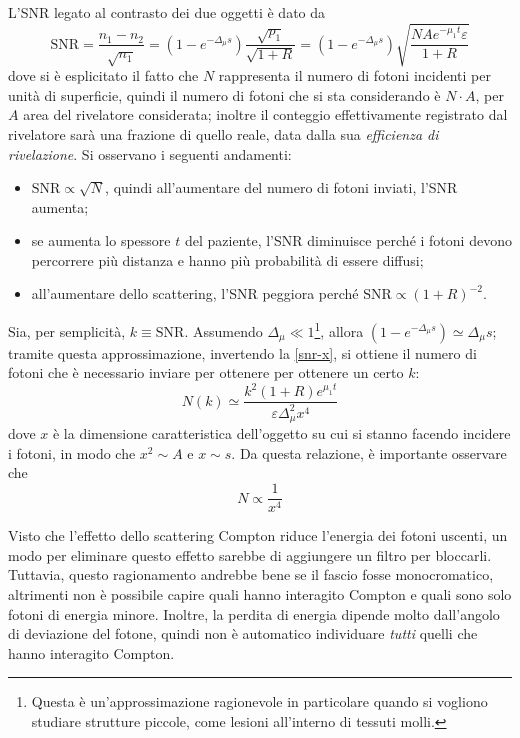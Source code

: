 \documentclass[11pt, a4paper]{scrartcl}
\theoremstyle{style}
\theoremstyle{style1}
\numberwithin{equation}{subsection}
\begin{document}
\noindent L'SNR legato al contrasto dei due oggetti \`e dato da 
\begin{equation}\label{snr-x}
\text{SNR} = \frac{n_1 - n_2}{ \sqrt{n_1} } = \left(1-e^{-\Delta _\mu  s}\right) \frac{\sqrt{p_1} }{\sqrt{1+R} } = \left(1- e^{-\Delta _\mu s}\right) \sqrt{\frac{NAe^{-\mu _1 t}\varepsilon }{1+R}} 
\end{equation}
dove si \`e esplicitato il fatto che $N$ rappresenta il numero di fotoni incidenti per unit\`a di superficie, quindi il numero di fotoni che si sta considerando \`e $N\cdot A$, per $A$ area del rivelatore considerata; inoltre il conteggio effettivamente registrato dal rivelatore sar\`a una frazione di quello reale, data dalla sua \textit{efficienza di rivelazione}.
Si osservano i seguenti andamenti:
\begin{itemize}
	\item $\text{SNR}\propto \sqrt{N} $, quindi all'aumentare del numero di fotoni inviati, l'SNR aumenta;
	\item se aumenta lo spessore $t$ del paziente, l'SNR diminuisce perch\'e i fotoni devono percorrere pi\`u distanza e hanno pi\`u probabilit\`a di essere diffusi;
	\item all'aumentare dello scattering, l'SNR peggiora perch\'e $\text{SNR} \propto (1+R)^{-2}$.
\end{itemize}
Sia, per semplicit\`a, $k\equiv \text{SNR}$.
Assumendo $\Delta _\mu  \ll 1$\footnote{Questa \`e un'approssimazione ragionevole in particolare quando si vogliono studiare strutture piccole, come lesioni all'interno di tessuti molli.}, allora $\left(1- e^{-\Delta _\mu  s}\right) \simeq \Delta _{\mu }s$; tramite questa approssimazione, invertendo la \ref{snr-x}, si ottiene il numero di fotoni che \`e necessario inviare per ottenere per ottenere un certo $k$:
\begin{equation}
	N(k) \simeq \frac{k^2 (1+R) e^{\mu _1 t}}{\varepsilon \Delta _\mu ^2 x^4}
\end{equation}
dove $x$ \`e la dimensione caratteristica dell'oggetto su cui si stanno facendo incidere i fotoni, in modo che $x^2 \sim A$ e $x \sim s$.
Da questa relazione, \`e importante osservare che 
\begin{equation}
	N \propto \frac{1}{x^4}
\end{equation}

Visto che l'effetto dello scattering Compton riduce l'energia dei fotoni uscenti, un modo per eliminare questo effetto sarebbe di aggiungere un filtro per bloccarli.
Tuttavia, questo ragionamento andrebbe bene se il fascio fosse monocromatico, altrimenti non \`e possibile capire quali hanno interagito Compton e quali sono solo fotoni di energia minore.
Inoltre, la perdita di energia dipende molto dall'angolo di deviazione del fotone, quindi non \`e automatico individuare \textit{tutti} quelli che hanno interagito Compton.
\end{document}

